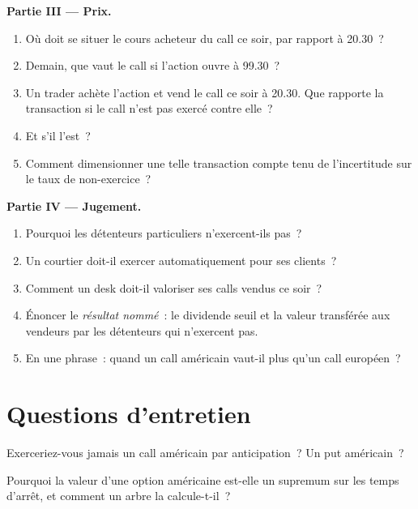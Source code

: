 \begin{problem}
\medskip\noindent\textbf{Partie III --- Prix.}
\begin{enumerate}[resume]
\item Où doit se situer le cours acheteur du call ce soir, par rapport à 20.30~?
\item Demain, que vaut le call si l'action ouvre à 99.30~?
\item Un trader achète l'action et vend le call ce soir à 20.30. Que rapporte la transaction
si le call n'est pas exercé contre elle~?
\item Et s'il l'est~?
\item Comment dimensionner une telle transaction compte tenu de l'incertitude sur le taux de non-exercice~?
\end{enumerate}

\medskip\noindent\textbf{Partie IV --- Jugement.}
\begin{enumerate}[resume]
\item Pourquoi les détenteurs particuliers n'exercent-ils pas~?
\item Un courtier doit-il exercer automatiquement pour ses clients~?
\item Comment un desk doit-il valoriser ses calls vendus ce soir~?
\item Énoncer le \emph{résultat nommé}~: le dividende seuil et la valeur transférée aux
vendeurs par les détenteurs qui n'exercent pas.
\item En une phrase~: quand un call américain vaut-il plus qu'un call européen~?
\end{enumerate}
\end{problem}

\section{Questions d'entretien}

\begin{interviewq}\label{iq:dv:american-options-and-early-exercise:1}
Exerceriez-vous jamais un call américain par anticipation~? Un put américain~?
\end{interviewq}

\begin{interviewq}\label{iq:dv:american-options-and-early-exercise:2}
Pourquoi la valeur d'une option américaine est-elle un supremum sur les temps d'arrêt, et comment un arbre
la calcule-t-il~?
\end{interviewq}

